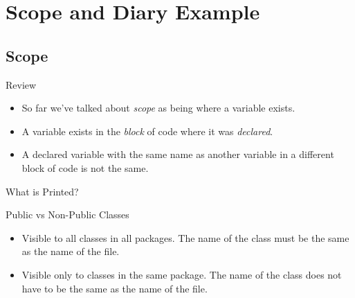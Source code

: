 ﻿
\section{Scope and Diary Example}
\subsection{Scope}

\begin{frame}[fragile]{Review}
\begin{itemize}
\item So far we've talked about \emph{scope} as being where a variable exists. \pause
\item A variable exists in the \emph{block} of code where it was \emph{declared}. \pause
\item A declared variable with the same name as another variable in a different block of code is not the same. \pause
\begin{semiverbatim}\end{semiverbatim}
\end{itemize}
\end{frame}

\begin{frame}[fragile]{What is Printed?}
\begin{semiverbatim}\end{semiverbatim}

\end{frame}


\begin{frame}{Public vs Non-Public Classes}
\begin{itemize}
\item {} Visible to all classes in all packages. The name of the class must be the same as the name of the file.
\item {} Visible only to classes in the same package. The name of the class does not have to be the same as the name of the file.
\end{itemize}
\end{frame}


